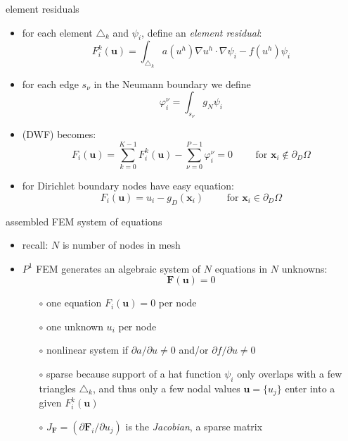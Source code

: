 \documentclass[hide notes,intlimits,usenames,dvipsnames]{beamer}
\newcommand{\bF}{\mathbf{F}}
\newcommand{\bu}{\mathbf{u}}
\newcommand{\bx}{\mathbf{x}}
\newcommand{\grad}{\nabla}
\begin{document}
\begin{frame}{element residuals}
\begin{itemize}
\item for each element $\triangle_k$ and $\psi_i$, define an \emph{element residual}:
\begin{equation*}
F_i^k(\bu) = \int_{\triangle_k} a(u^h) \grad u^h \cdot \grad \psi_i - f(u^h) \psi_i
\end{equation*}
\item for each edge $s_\nu$ in the Neumann boundary we define
\begin{equation*}
\varphi_i^\nu = \int_{s_\nu} g_N \psi_i
\end{equation*}

\vspace{-2mm}
\item (DWF) becomes:
\begin{equation*}
F_i(\bu) = \sum_{k=0}^{K-1} F_i^k(\bu) - \sum_{\nu=0}^{P-1} \varphi_i^\nu = 0 \qquad \text{ for } \bx_i \notin \partial_D\Omega
\end{equation*}
\item for Dirichlet boundary nodes have easy equation:
\begin{equation*}
F_i(\bu) = u_i - g_D(\bx_i) \qquad \text{ for } \bx_i \in \partial_D\Omega
\end{equation*}
\end{itemize}
\end{frame}


\begin{frame}{assembled FEM system of equations}
\begin{itemize}
\item recall: $N$ is number of nodes in mesh
\item $P^1$ FEM generates an algebraic system of $N$ equations in $N$ unknowns:
\begin{equation*}
\bF(\bu)=0  \tag{$\ast$}
\end{equation*}
    \begin{itemize}
    \item[$\circ$] one equation $F_i(\bu)=0$ per node
    \item[$\circ$] one unknown $u_i$ per node
    \item[$\circ$] nonlinear system if $\partial a/\partial u \ne 0$ and/or $\partial f/\partial u \ne 0$
    \item[$\circ$] sparse because support of a hat function $\psi_i$ only overlaps with a few triangles $\triangle_k$, and thus only a few nodal values $\bu=\{u_j\}$ enter into a given $F_i^k(\bu)$
    \item[$\circ$] $J_{\bF} = (\partial \bF_i/\partial u_j)$ is the \emph{Jacobian}, a sparse matrix
    \end{itemize}
\end{itemize}
\end{frame}
\end{document}
